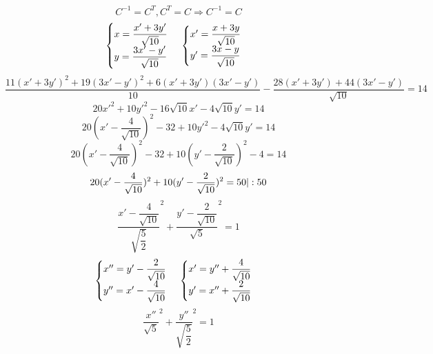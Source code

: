 \documentclass[12pt]{article}
\begin{document}
    \[
        C^{-1} = C^T, C^T = C \Rightarrow C^{-1} = C
    \]
    \[
        \begin{cases}
            x = \dfrac{x' + 3y'}{\sqrt{10}} \\
            y = \dfrac{3x' - y'}{\sqrt{10}}
        \end{cases} \\
        \begin{cases}
            x' = \dfrac{x + 3y}{\sqrt{10}} \\
            y' = \dfrac{3x - y}{\sqrt{10}}
        \end{cases}
    \]
    \[
        \dfrac{11(x' + 3y')^2 + 19(3x' - y')^2 + 6(x' + 3y')(3x' - y')}{10} - \dfrac{28(x' + 3y') + 44(3x' - y')}{\sqrt{10}} = 14
    \]
    \[
        20{x'}^2 + 10{y'}^2 - 16\sqrt{10}x' - 4\sqrt{10}y' = 14
    \]
    \[
        20(x' - \dfrac{4}{\sqrt{10}})^2 - 32 + 10{y'}^2 - 4\sqrt{10}y' = 14
    \]
    \[
        20(x' - \dfrac{4}{\sqrt{10}})^2 - 32 + 10(y' - \dfrac{2}{\sqrt{10}})^2 - 4 = 14
    \]
    \[
        20(x' - \dfrac{4}{\sqrt{10}})^2 + 10(y' - \dfrac{2}{\sqrt{10}})^2 = 50 \\ |:50
    \]
    \[
        \dfrac{x' - \dfrac{4}{\sqrt{10}}}{\sqrt{\dfrac{5}{2}}}^2 + \dfrac{y' - \dfrac{2}{\sqrt{10}}}{\sqrt{5}}^2 = 1
    \]
    \[
        \begin{cases}
            x'' = y' - \dfrac{2}{\sqrt{10}} \\
            y'' = x' - \dfrac{4}{\sqrt{10}} \\
        \end{cases}
        \\
        \begin{cases}
            x' = y'' + \dfrac{4}{\sqrt{10}} \\
            y' = x'' + \dfrac{2}{\sqrt{10}} \\
        \end{cases}
    \]
    \[
        \dfrac{x''}{\sqrt{5}}^2 + \dfrac{y''}{\sqrt{\dfrac{5}{2}}}^2 = 1
    \]
\end{document}
